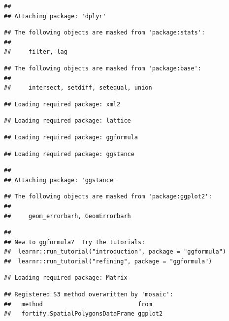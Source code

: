 \documentclass[
]{book}
\begin{document}
\begin{verbatim}
## 
## Attaching package: 'dplyr'
\end{verbatim}

\begin{verbatim}
## The following objects are masked from 'package:stats':
## 
##     filter, lag
\end{verbatim}

\begin{verbatim}
## The following objects are masked from 'package:base':
## 
##     intersect, setdiff, setequal, union
\end{verbatim}

\begin{verbatim}
## Loading required package: xml2
\end{verbatim}

\begin{verbatim}
## Loading required package: lattice
\end{verbatim}

\begin{verbatim}
## Loading required package: ggformula
\end{verbatim}

\begin{verbatim}
## Loading required package: ggstance
\end{verbatim}

\begin{verbatim}
## 
## Attaching package: 'ggstance'
\end{verbatim}

\begin{verbatim}
## The following objects are masked from 'package:ggplot2':
## 
##     geom_errorbarh, GeomErrorbarh
\end{verbatim}

\begin{verbatim}
## 
## New to ggformula?  Try the tutorials: 
## 	learnr::run_tutorial("introduction", package = "ggformula")
## 	learnr::run_tutorial("refining", package = "ggformula")
\end{verbatim}

\begin{verbatim}
## Loading required package: Matrix
\end{verbatim}

\begin{verbatim}
## Registered S3 method overwritten by 'mosaic':
##   method                           from   
##   fortify.SpatialPolygonsDataFrame ggplot2
\end{verbatim}
\end{document}
